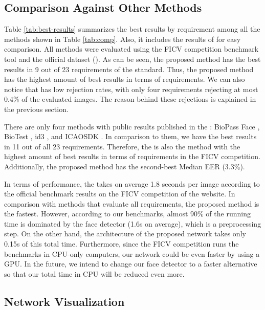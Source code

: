 \subsection{Comparison Against Other Methods}

Table \ref{tab:best-results} summarizes the best results by requirement among all the methods shown in Table \ref{tab:comp}. Also, it includes the results of \methodname for easy comparison. All methods were evaluated using the FICV competition benchmark tool and the official dataset (\ficvofficial). As can be seen, the proposed method has the best results in 9 out of 23 requirements of the \icao standard. Thus, the proposed method has the highest amount of best results in terms of requirements. We can also notice that \methodname has low rejection rates, with only four requirements rejecting at most 0.4\% of the evaluated images. The reason behind these rejections is explained in the previous section. 



There are only four methods with public results published in the \fvcongoing: BioPass Face \citep{fvcVsoft}, BioTest \citep{fvcBioTest}, id3 \citep{fvcICAOCompliance}, and ICAOSDK \citep{fvcSeamfix}. In comparison to them, we have the best results in 11 out of all 23 requirements. Therefore, the \methodname is also the method with the highest amount of best results in terms of requirements in the FICV competition. Additionally, the proposed method has the second-best Median EER (3.3\%).

In terms of performance, the \methodname takes on average 1.8 seconds per image according to the official benchmark results on the FICV competition of the \fvcongoing website. In comparison with methods that evaluate all requirements, the proposed method is the fastest. However, according to our benchmarks, almost 90\% of the \methodname running time is dominated by the face detector (1.6s on average), which is a preprocessing step. On the other hand, the architecture of the proposed network takes only 0.15s of this total time. Furthermore, since the FICV competition runs the benchmarks in CPU-only computers, our network could be even faster by using a GPU. In the future, we intend to change our face detector to a faster alternative so that our total time in CPU will be reduced even more.

\subsection{Network Visualization} \label{sec:netviz}

